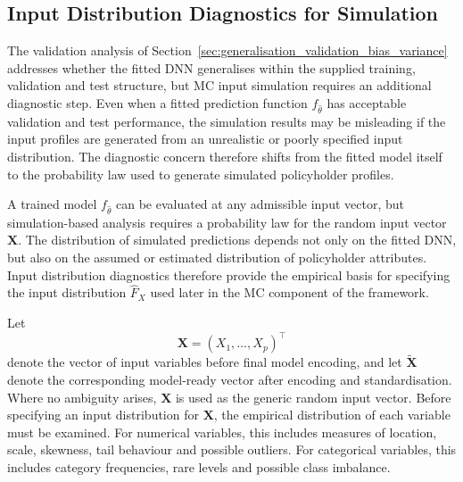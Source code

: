 \newpage


\subsection{Input Distribution Diagnostics for Simulation}
\label{sec:input_distribution_diagnostics}

\noindent
The validation analysis of
Section~\ref{sec:generalisation_validation_bias_variance} addresses whether
the fitted DNN generalises within the supplied
training, validation and test structure, but MC input simulation requires an
additional diagnostic step. Even when a fitted prediction function
\(f_{\widehat{\theta}}\) has acceptable validation and test performance, the
simulation results may be misleading if the input profiles are generated from an
unrealistic or poorly specified input distribution. The diagnostic concern
therefore shifts from the fitted model itself to the probability law used to
generate simulated policyholder profiles.

\noindent
A trained model \(f_{\widehat{\theta}}\) can be evaluated at any admissible
input vector, but simulation-based analysis requires a probability law for the
random input vector \(\mathbf{X}\). The distribution of simulated predictions
depends not only on the fitted DNN, but also on the assumed or estimated
distribution of policyholder attributes. Input distribution diagnostics therefore
provide the empirical basis for specifying the input distribution
\(\widehat{F}_{X}\) used later in the MC component of the framework.

\noindent
Let
\[
    \mathbf{X}
    =
    (X_1,\ldots,X_p)^{\top}
\]
denote the vector of input variables before final model encoding, and let
\(\widetilde{\mathbf{X}}\) denote the corresponding model-ready vector after
encoding and standardisation. Where no ambiguity arises, \(\mathbf{X}\) is used
as the generic random input vector. Before specifying an input distribution for
\(\mathbf{X}\), the empirical distribution of each variable must be examined.
For numerical variables, this includes measures of location, scale, skewness,
tail behaviour and possible outliers. For categorical variables, this includes
category frequencies, rare levels and possible class imbalance.

